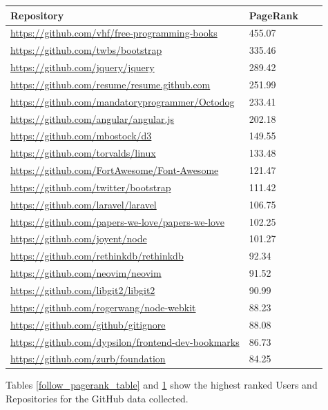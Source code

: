 \begin{table}[ht]
\centering
\small\renewcommand{\arraystretch}{1.4}  
%
\label{star_pagerank_table}
%
\begin{tabularx}{0.8\textwidth}{lXXX}
\hline
\rowcolor{tableheadcolor}
Repository & PageRank \\
\hline
\url{https://github.com/vhf/free-programming-books} & 455.07 \\
\url{https://github.com/twbs/bootstrap} & 335.46 \\
\url{https://github.com/jquery/jquery} & 289.42 \\
\url{https://github.com/resume/resume.github.com} & 251.99 \\
\url{https://github.com/mandatoryprogrammer/Octodog} & 233.41 \\
\url{https://github.com/angular/angular.js} & 202.18 \\
\url{https://github.com/mbostock/d3} &149.55 \\
\url{https://github.com/torvalds/linux} & 133.48 \\
\url{https://github.com/FortAwesome/Font-Awesome} & 121.47 \\
\url{https://github.com/twitter/bootstrap} & 111.42 \\
\url{https://github.com/laravel/laravel} & 106.75 \\
\url{https://github.com/papers-we-love/papers-we-love} & 102.25 \\
\url{https://github.com/joyent/node} &101.27 \\
\url{https://github.com/rethinkdb/rethinkdb} & 92.34 \\
\url{https://github.com/neovim/neovim} & 91.52 \\
\url{https://github.com/libgit2/libgit2} & 90.99 \\
\url{https://github.com/rogerwang/node-webkit} & 88.23 \\
\url{https://github.com/github/gitignore} & 88.08 \\
\url{https://github.com/dypsilon/frontend-dev-bookmarks} & 86.73 \\
\url{https://github.com/zurb/foundation} & 84.25 \\
\hline
\end{tabularx}
\end{table}

Tables \ref{follow_pagerank_table} and \ref{star_pagerank_table} show the highest ranked Users and Repositories for the GitHub data collected. 


